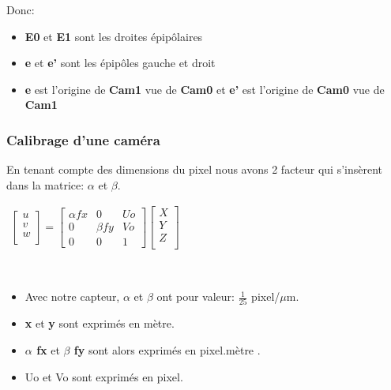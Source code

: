 \documentclass[12pt, french]{report}
\begin{document}
Donc: \\
\begin{itemize}
    \item \textbf{E0} et \textbf{E1} sont les droites épipôlaires
    \item \textbf{e} et \textbf{e'} sont les épipôles gauche et droit
    \item \textbf{e} est l'origine de \textbf{Cam1} vue de \textbf{Cam0} et \textbf{e'} est l'origine de \textbf{Cam0} vue de \textbf{Cam1}
\end{itemize} 

\subsubsection{Calibrage d'une caméra}

En tenant compte des dimensions du pixel nous avons 2 facteur qui s'insèrent dans la matrice: \textbf{$\alpha$} et \textbf{$\beta$}.\\

\begin{center}
    $\begin{matrix}
        \begin{bmatrix}
            u\\v\\w\\
        \end{bmatrix}
        =
        \begin{bmatrix}
            \alpha fx &0 &Uo\\
            0&\beta fy&Vo\\
            0&0&1
        \end{bmatrix}
        \begin{bmatrix}
            X\\Y\\Z\\
        \end{bmatrix}
    \end{matrix}$
\end{center}\\
\begin{itemize}
    \item Avec notre capteur, \textbf{$\alpha$} et \textbf{$\beta$} ont pour valeur:  $\frac{1}{25}$ pixel/$\mu$m.
    \item \textbf{x} et \textbf{y} sont exprimés en mètre.
    \item \textbf{$\alpha$ fx} et \textbf{$\beta$ fy} sont alors exprimés en pixel.mètre . 
    \item Uo et Vo  sont exprimés en pixel. 
\end{itemize}
\end{document}
